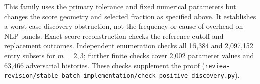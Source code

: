 This family uses the primary tolerance and fixed numerical parameters but changes the score geometry and selected fraction as specified above. It establishes a worst-case discovery obstruction, not the frequency or cause of overhead on NLP panels. Exact score reconstruction checks the reference cutoff and replacement outcomes. Independent enumeration checks all 16,384 and 2,097,152 entry subsets for $m=2,3$; further finite checks cover 2,002 parameter values and 63,466 adversarial histories. These checks supplement the proof (\nolinkurl{review-revision/stable-batch-implementation/check_positive_discovery.py}).

